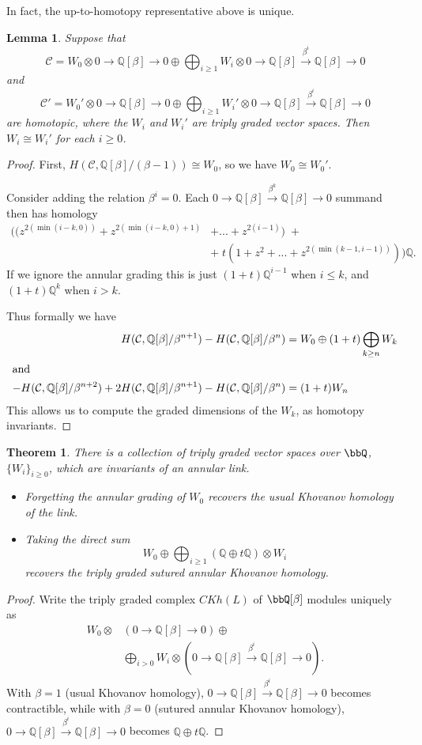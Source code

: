 \documentclass{amsart}
\theoremstyle{plain}
\newtheorem{thm}[prop]{Theorem}
\newtheorem{lem}[prop]{Lemma}
\newcommand{\complexzero}{0\rightarrow\mathbb Q [\beta]\rightarrow 0}
\newcommand{\complexk}[1]{0\rightarrow\mathbb Q [\beta]\xrightarrow{\beta^{#1}}{}\mathbb Q [\beta]\rightarrow 0}
\begin{document}
In fact, the up-to-homotopy representative above is unique.
\begin{lem}
Suppose that 
$$ \mathcal C = W_0 \otimes \complexzero \oplus \bigoplus_{i \geq 1} W_i \otimes \complexk{i} $$
and 
$$ \mathcal C' = W_0' \otimes \complexzero \oplus \bigoplus_{i \geq 1} W_i' \otimes \complexk{i} $$
are homotopic, where the $W_i$ and $W_i'$ are triply graded vector spaces.
Then $W_i \cong W_i'$ for each $i \geq 0$.
\end{lem}
\begin{proof}
First, $H(\mathcal C, \mathbb Q[\beta]/(\beta - 1)) \cong W_0$, so we have $W_0 \cong W_0'$.

Consider adding the relation $\beta^i = 0$. Each $\complexk{k}$ summand then has homology
\begin{align*}
\Big((z^{2(\min(i-k,0))} + z^{2(\min(i-k,0)+1)} & + ... + z^{2(i-1)}) \;+  \\
 &  + \;t(1 + z^2 + ... + z^{2(\min(k-1,i-1))})\Big)\mathbb Q.
\end{align*}
If we ignore the annular grading this is just
$(1+t) \mathbb Q^{i-1}$ when $i \leq k$, and $(1+t) \mathbb Q^k$ when $i > k$.

Thus formally we have
\begin{align*}
H(\mathcal C, \mathbb Q[\beta]/\beta^{n+1}) - H(\mathcal C, \mathbb Q[\beta]/\beta^n) & = W_0 \oplus (1+t) \bigoplus_{k \geq n} W_k \\
\intertext{and}
- H(\mathcal C, \mathbb Q[\beta]/\beta^{n+2}) + 2 H(\mathcal C, \mathbb Q[\beta]/\beta^{n+1}) -  H(\mathcal C, \mathbb Q[\beta]/\beta^{n}) & = (1+t) W_n 
\end{align*}
This allows us
to compute the graded dimensions of the $W_k$, as homotopy invariants.
\end{proof}

\begin{thm}
There is a collection of triply graded vector spaces over $\bbQ$, $\{W_i\}_{i \geq 0}$, which are invariants of an annular link.
\begin{itemize}
\item Forgetting the annular grading of $W_0$ recovers the usual Khovanov homology of the link.
\item Taking the direct sum $$W_0 \oplus \bigoplus_{i \geq 1} (\mathbb Q \oplus t \mathbb Q) \otimes W_i$$ recovers the triply graded sutured annular Khovanov homology.
\end{itemize}
\end{thm}
\begin{proof}
Write the triply graded complex $CKh(L)$ of $\bbQ[\beta]$ modules uniquely as 
\begin{align*}
W_0 \otimes & \left(\complexzero\right) \oplus \\
            & \bigoplus_{i > 0} W_i \otimes \left( \complexk{i} \right).
\end{align*}
With $\beta = 1$ (usual Khovanov homology), $\complexk{i}$ becomes contractible, while with $\beta = 0$ (sutured annular Khovanov homology), $\complexk{i}$ becomes $\mathbb Q \oplus t \mathbb Q$.
\end{proof}
\end{document}
